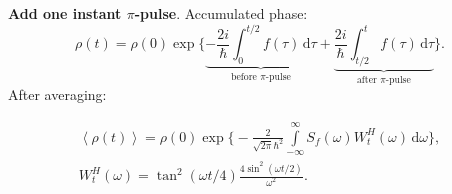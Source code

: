 \documentclass[aspectratio=169, 13pt, t]{beamer}
\newcommand{\diff}{\,\mathrm{d}}
\begin{document}
\begin{frame}[t]\frametitle{\secname}\framesubtitle{\subsecname}
\textbf{Add one instant $\pi$-pulse}. Accumulated phase:
\begin{equation*}
\rho(t) = \rho(0)\exp \Big\{ \underbrace{- \frac{2i}{\hbar}\int_0^{t/2} f(\tau)  \diff \tau}_{\text{before }\pi\text{-pulse}} + \underbrace{\frac{2i}{\hbar}\int_{t/2}^{t} f(\tau)  \diff \tau}_{\text{after }\pi\text{-pulse}} \Big	\}.
\end{equation*}
After averaging:
\begin{mybox}
\[
\begin{gathered}
\left<\rho(t)\right> = \rho(0)\exp \Big\{ - \frac{2}{\sqrt{2\pi} \hbar^2} \int\limits_{-\infty}^{\infty}  S_f(\omega) W^H_t (\omega)\diff \omega \Big\},\\
W^H_t (\omega) = \tan^2(\omega t/4)\frac{4 \sin^2(\omega t/2)}{\omega^2}.
\end{gathered}
\]
\end{mybox}
\end{frame}
\end{document}
